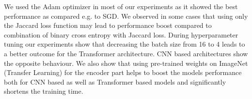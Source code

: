 \par
We used the Adam optimizer in most of our experiments as it showed the best performance as compared e.g. to SGD. We observed in some cases that using only the Jaccard loss function may lead to performance boost compared to combination of binary cross entropy with Jaccard loss. During hyperparameter tuning our experiments show that decreasing the batch size from 16 to 4 leads to a better outcome for the Transformer architecture. CNN based architectures show the opposite behaviour. We also show that using pre-trained weights on ImageNet (Transfer Learning) for the encoder part helps to boost the models performance both for CNN based as well as Transformer based models and significantly shortens the training time.


